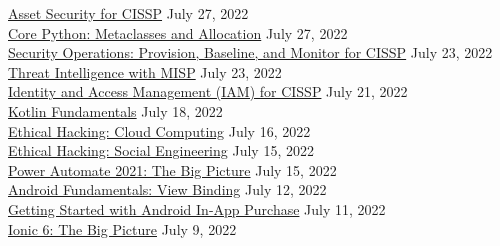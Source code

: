 \documentclass[10pt]{res} %
\begin{document}
\begin{resume}
\href{https://bjdelacruz.dev/files/certificates/pluralsight/3_Asset_Security_for_CISSP.pdf}{\color{blue}Asset Security for CISSP\textsuperscript{\textregistered}} \hfill July 27, 2022 \\
\href{https://bjdelacruz.dev/files/certificates/pluralsight/13_Core_Python_Metaclasses_and_Allocation.pdf}{\color{blue}Core Python: Metaclasses and Allocation} \hfill July 27, 2022 \\
\href{https://bjdelacruz.dev/files/certificates/pluralsight/9_Security_Operations_Provision_Baseline_and_Monitor_for_CISSP.pdf}{\color{blue}Security Operations: Provision, Baseline, and Monitor for CISSP\textsuperscript{\textregistered}} \hfill July 23, 2022 \\
\href{https://bjdelacruz.dev/files/certificates/pluralsight/27_Threat_Intelligence_with_MISP.pdf}{\color{blue}Threat Intelligence with MISP} \hfill July 23, 2022 \\
\href{https://bjdelacruz.dev/files/certificates/pluralsight/7_Identity_and_Access_Management_IAM_for_CISSP.pdf}{\color{blue}Identity and Access Management (IAM) for CISSP\textsuperscript{\textregistered}} \hfill July 21, 2022 \\
\href{https://bjdelacruz.dev/files/certificates/pluralsight/Kotlin_Fundamentals.pdf}{\color{blue}Kotlin Fundamentals} \hfill July 18, 2022 \\
\href{https://bjdelacruz.dev/files/certificates/pluralsight/15_Ethical_Hacking_Cloud_Computing.pdf}{\color{blue}Ethical Hacking: Cloud Computing} \hfill July 16, 2022 \\
\href{https://bjdelacruz.dev/files/certificates/pluralsight/9_Ethical_Hacking_Social_Engineering.pdf}{\color{blue}Ethical Hacking: Social Engineering} \hfill July 15, 2022 \\
\href{https://bjdelacruz.dev/files/certificates/pluralsight/Power_Automate_2021_The_Big_Picture.pdf}{\color{blue}Power Automate 2021: The Big Picture} \hfill July 15, 2022 \\
\href{https://bjdelacruz.dev/files/certificates/pluralsight/Android_Fundamentals_View_Binding.pdf}{\color{blue}Android Fundamentals: View Binding} \hfill July 12, 2022 \\
\href{https://bjdelacruz.dev/files/certificates/pluralsight/Getting_Started_with_Android_In_App_Purchase.pdf}{\color{blue}Getting Started with Android In-App Purchase} \hfill July 11, 2022 \\
\href{https://bjdelacruz.dev/files/certificates/pluralsight/Ionic_6_The_Big_Picture.pdf}{\color{blue}Ionic 6: The Big Picture} \hfill July 9, 2022 \\

\end{resume}
\end{document}
